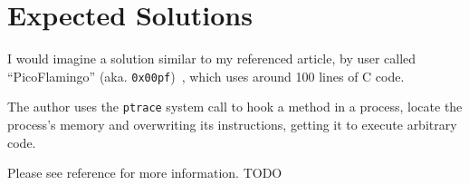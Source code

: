\documentclass[a4paper, 11pt]{article}
\theoremstyle{definition}
\begin{document}
\section{Expected Solutions}

I would imagine a solution similar to my referenced article, by user
called ``PicoFlamingo'' (aka. {\tt 0x00pf})~\cite{0x00sec}, which uses
around 100 lines of C code.

The author uses the {\tt ptrace} system call to hook a method in a
process, locate the process's memory and overwriting its instructions,
getting it to execute arbitrary code.

Please see reference for more information. TODO



\end{document}
